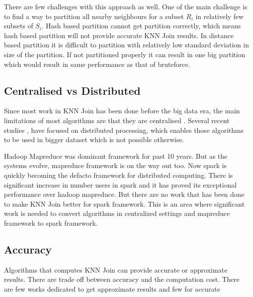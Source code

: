 \documentclass[conference]{IEEEtran}
\begin{document}
\medskip

There are few challenges with this approach as well. One
of the main challenge is to find a way to partition all nearby neighbours for a subset
$R_i$ in relatively few subsets of $S_i$. Hash based partition cannot
get partition correctly, which means hash based partition will not
provide accurate KNN Join results. In distance based partition it is difficult to partition
with relatively low standard deviation in size of the partition. If
not partitioned properly it can result in one big partition which
would result in same performance as that of bruteforce.

\bigskip

\subsection{Centralised vs Distributed}

Since most work in KNN Join has been done before the big data era,
the main limitations of most algorithms are that they are centralised
\cite{jagadish_idistance:_2005} \cite{xia_gorder:_2004}
\cite{bohm_k-nearest_2004} \cite{kuan_fast_1997} \cite{yu_high-dimensional_2010}.
Several recent studies \cite{stupar_rankreduceprocessing_2010},
\cite{lu_efficient_2012} have focused on distributed
processing, which enables those algorithms to be used in bigger
dataset which is not possible otherwise.

\medskip

Hadoop Mapreduce was dominant framework for past 10 years. But as the
systems evolve, mapreduce framework is on the way out
too. Now spark is quickly becoming the defacto framework for
distributed computing. There is significant increase in number users
in spark and it has proved its exceptional performance over
hadoop mapreduce. But there are no work that has been done to make
KNN Join better for spark framework. This is an area where significant
work is needed to convert algorithms in centralized settings and mapreduce framework  to spark
framework.

\subsection{Accuracy}
Algorithms that computes KNN Join can provide accurate or approximate results. There
are trade off between accuracy and the computation cost. There are few
works dedicated to get approximate results \cite{stupar_rankreduceprocessing_2010}
\cite{zhang_efficient_2012} and few for accurate
\cite{jagadish_idistance:_2005} \cite{xia_gorder:_2004}
\cite{lu_efficient_2012}
\end{document}
